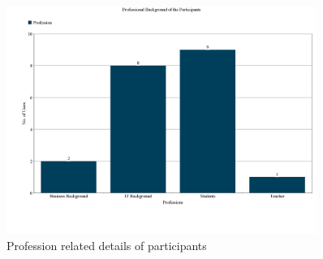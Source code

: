 \begin{figure}[!h]
    \centering
    \includegraphics[width=0.9\textwidth]{img/Profession_Graph_Updated.PNG}
    \caption{Profession related details of participants}
    \label{fig:profGraph}
\end{figure}

